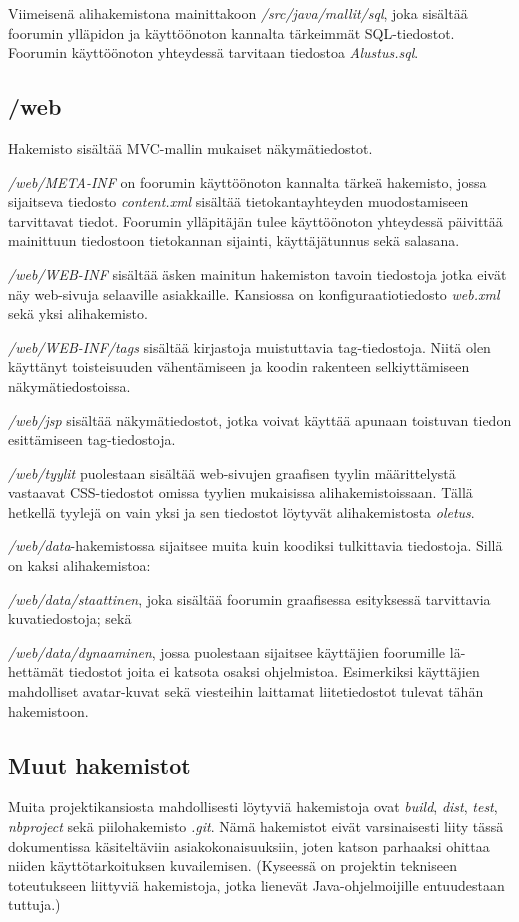 \documentclass[11pt]{article}
\begin{document}
			Viimeisenä alihakemistona mainittakoon \emph{/src/java/mallit/sql}, joka sisältää foorumin
			ylläpidon ja käyttöönoton kannalta tärkeimmät SQL-tiedostot. Foorumin käyttöönoton yhteydessä
			tarvitaan tiedostoa \emph{Alustus.sql}.
			
		\newpage
		\thispagestyle{plain}
		\subsection{/web}
			Hakemisto sisältää MVC-mallin mukaiset näkymätiedostot.
			
			\emph{/web/META-INF} on foorumin käyttöönoton kannalta tärkeä hakemisto, jossa sijaitseva 
			tiedosto \emph{content.xml} sisältää tietokantayhteyden muodostamiseen tarvittavat tiedot.
			Foorumin ylläpitäjän tulee käyttöönoton yhteydessä päivittää mainittuun tiedostoon tietokannan
			sijainti, käyttäjätunnus sekä salasana.
			
			\emph{/web/WEB-INF} sisältää äsken mainitun hakemiston tavoin tiedostoja jotka eivät näy
			web-sivuja selaaville asiakkaille. Kansiossa on konfiguraatiotiedosto \emph{web.xml} sekä yksi
			alihakemisto.
			
			\emph{/web/WEB-INF/tags} sisältää kirjastoja muistuttavia tag-tiedostoja. Niitä olen
			käyttänyt toisteisuuden vähentämiseen ja koodin rakenteen selkiyttämiseen näkymätiedostoissa.
			
			\emph{/web/jsp} sisältää näkymätiedostot, jotka voivat käyttää apunaan toistuvan tiedon
			esittämiseen tag-tiedostoja.
			
			\emph{/web/tyylit} puolestaan sisältää web-sivujen graafisen tyylin määrittelystä vastaavat
			CSS-tiedostot omissa tyylien mukaisissa alihakemistoissaan. Tällä hetkellä tyylejä on vain yksi
			ja sen tiedostot löytyvät alihakemistosta \emph{oletus}.
			
			\emph{/web/data}-hakemistossa sijaitsee muita kuin koodiksi tulkittavia tiedostoja. Sillä on
			kaksi alihakemistoa:
			
			\emph{/web/data/staattinen}, joka sisältää foorumin graafisessa esityksessä tarvittavia
			kuvatiedostoja; sekä
			
			\emph{/web/data/dynaaminen}, jossa puolestaan sijaitsee käyttäjien foorumille lä-hettämät
			tiedostot joita ei katsota osaksi ohjelmistoa. Esimerkiksi käyttäjien mahdolliset avatar-kuvat
			sekä viesteihin laittamat liitetiedostot tulevat tähän hakemistoon.
			
		\subsection{Muut hakemistot}
			Muita projektikansiosta mahdollisesti löytyviä hakemistoja ovat \emph{build}, \emph{dist},
			\emph{test}, \emph{nbproject} sekä piilohakemisto \emph{.git}. Nämä hakemistot eivät 
			varsinaisesti liity tässä dokumentissa käsiteltäviin asiakokonaisuuksiin, joten katson 
			parhaaksi ohittaa niiden käyttötarkoituksen kuvailemisen. (Kyseessä on projektin tekniseen
			toteutukseen liittyviä hakemistoja, jotka lienevät Java-ohjelmoijille entuudestaan tuttuja.)
			
\end{document}
